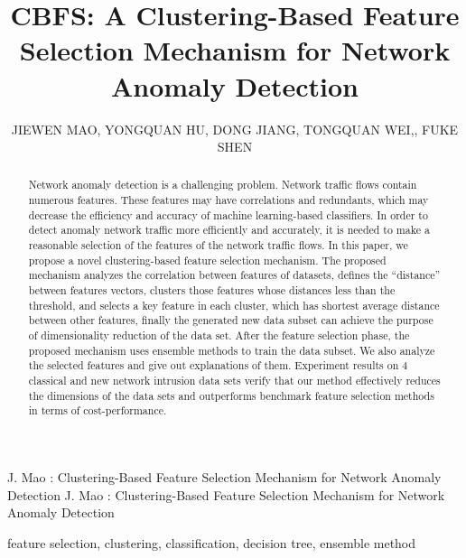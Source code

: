 \documentclass{ieeeaccess}
\theoremstyle{definition}
\begin{document}

\title{CBFS: A Clustering-Based Feature Selection Mechanism for Network Anomaly Detection}
\author{
    \uppercase{Jiewen Mao},
    \uppercase{Yongquan Hu},
    \uppercase{Dong Jiang},
    \uppercase{Tongquan Wei},, \uppercase{Fuke Shen}}
\address{School of Computer Science and Technology, East China Normal University, Shanghai 200062, China}

\markboth
{J. Mao \headeretal: Clustering-Based Feature Selection Mechanism for Network Anomaly Detection}
{J. Mao \headeretal: Clustering-Based Feature Selection Mechanism for Network Anomaly Detection}


\begin{abstract}
Network anomaly detection is a challenging problem. Network traffic flows contain numerous features. These features may have correlations and redundants, which may decrease the efficiency and accuracy of machine learning-based classifiers. In order to detect anomaly network traffic more efficiently and accurately, it is needed to make a reasonable selection of the features of the network traffic flows. In this paper, we propose a novel clustering-based feature selection mechanism. The proposed mechanism analyzes the correlation between features of datasets, defines the ``distance'' between features vectors, clusters those features whose distances less than the threshold, and selects a key feature in each cluster, which has shortest average distance between other features, finally the generated new data subset can achieve the purpose of dimensionality reduction of the data set. After the feature selection phase, the proposed mechanism uses ensemble methods to train the data subset. We also analyze the selected features and give out explanations of them. Experiment results on 4 classical and new network intrusion data sets verify that our method effectively reduces the dimensions of the data sets and outperforms benchmark feature selection methods in terms of cost-performance.
\end{abstract}

\begin{keywords}
    feature selection, clustering, classification, decision tree, ensemble method
\end{keywords}
\end{document}
